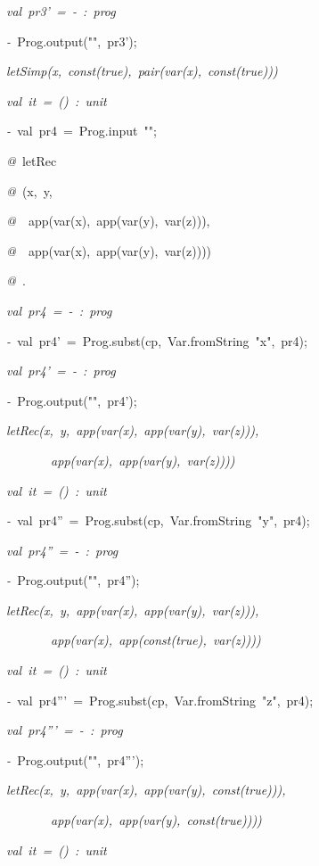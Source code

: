 \begin{list}{}
\item[]\textsl{val\ pr3'\ =\ -\ :\ prog}
\item[]\textsl{-\ }Prog.output("",\ pr3');
\item[]\textsl{letSimp(x,\ const(true),\ pair(var(x),\ const(true)))}
\item[]\textsl{val\ it\ =\ ()\ :\ unit}
\item[]\textsl{-\ }val\ pr4\ =\ Prog.input\ "";
\item[]\textsl{@\ }letRec
\item[]\textsl{@\ }(x,\ y,
\item[]\textsl{@\ }\ app(var(x),\ app(var(y),\ var(z))),
\item[]\textsl{@\ }\ app(var(x),\ app(var(y),\ var(z))))
\item[]\textsl{@\ }.
\item[]\textsl{val\ pr4\ =\ -\ :\ prog}
\item[]\textsl{-\ }val\ pr4'\ =\ Prog.subst(cp,\ Var.fromString\ "x",\ pr4);
\item[]\textsl{val\ pr4'\ =\ -\ :\ prog}
\item[]\textsl{-\ }Prog.output("",\ pr4');
\item[]\textsl{letRec(x,\ y,\ app(var(x),\ app(var(y),\ var(z))),}
\item[]\textsl{\ \ \ \ \ \ \ app(var(x),\ app(var(y),\ var(z))))}
\item[]\textsl{val\ it\ =\ ()\ :\ unit}
\item[]\textsl{-\ }val\ pr4''\ =\ Prog.subst(cp,\ Var.fromString\ "y",\ pr4);
\item[]\textsl{val\ pr4''\ =\ -\ :\ prog}
\item[]\textsl{-\ }Prog.output("",\ pr4'');
\item[]\textsl{letRec(x,\ y,\ app(var(x),\ app(var(y),\ var(z))),}
\item[]\textsl{\ \ \ \ \ \ \ app(var(x),\ app(const(true),\ var(z))))}
\item[]\textsl{val\ it\ =\ ()\ :\ unit}
\item[]\textsl{-\ }val\ pr4'''\ =\ Prog.subst(cp,\ Var.fromString\ "z",\ pr4);
\item[]\textsl{val\ pr4'''\ =\ -\ :\ prog}
\item[]\textsl{-\ }Prog.output("",\ pr4''');
\item[]\textsl{letRec(x,\ y,\ app(var(x),\ app(var(y),\ const(true))),}
\item[]\textsl{\ \ \ \ \ \ \ app(var(x),\ app(var(y),\ const(true))))}
\item[]\textsl{val\ it\ =\ ()\ :\ unit}
\end{list}
